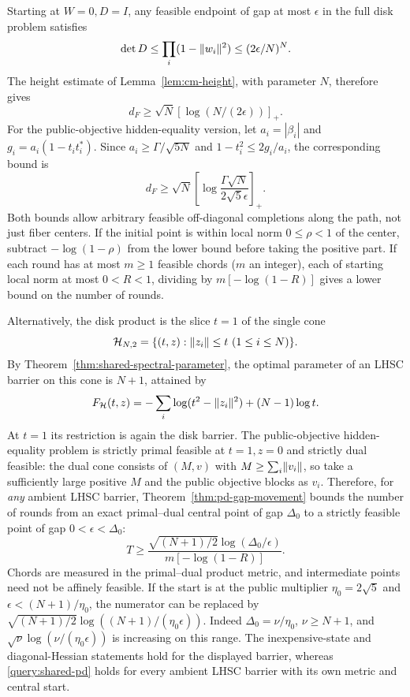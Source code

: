 Starting at $W=0,D=I$, any feasible endpoint of gap at most $\epsilon$
in the full disk problem satisfies
\[
 \det D\leq\prod_i(1-\lVert w_i\rVert^2)
       \leq(2\epsilon/N)^N.
\]
The height estimate of Lemma~\ref{lem:cm-height}, with parameter $N$,
therefore gives
\[
 d_F\geq\sqrt N[\log(N/(2\epsilon))]_+.
\]
For the public-objective hidden-equality version, let $a_i=|\beta_i|$
and $g_i=a_i(1-t_i t_i^*)$. Since $a_i\geq\Gamma/\sqrt{5N}$ and
$1-t_i^2\leq2g_i/a_i$, the corresponding bound is
\begin{equation}\label{query:packed-distance}
 d_F\geq\sqrt N
 \left[\log\frac{\Gamma\sqrt N}{2\sqrt5\epsilon}\right]_+.
\end{equation}
Both bounds allow arbitrary feasible off-diagonal completions along the
path, not just fiber centers. If the initial point is within local
norm $0\leq\rho<1$ of the center, subtract $-\log(1-\rho)$ from the
lower bound before taking the positive part. If each round has at most $m\geq1$ feasible chords ($m$ an integer), each of
starting local norm at most $0<R<1$, dividing by $m[-\log(1-R)]$ gives a
lower bound on the number of rounds.

Alternatively, the disk product is the slice $t=1$ of the single cone
\[
 \mathcal H_{N,2}=\{(t,z):\lVert z_i\rVert\leq t\ (1\leq i\leq N)\}.
\]
By Theorem~\ref{thm:shared-spectral-parameter}, the optimal parameter of
an LHSC barrier on this cone is $N+1$,
attained by
\[
 F_{\mathcal H}(t,z)=-\sum_i\log(t^2-\lVert z_i\rVert^2)+(N-1)\log t.
\]
At $t=1$ its restriction is again the disk barrier. The
public-objective hidden-equality problem is strictly primal feasible at
$t=1,z=0$ and strictly dual feasible: the dual cone consists of
$(M,v)$ with $M\geq\sum_i\lVert v_i\rVert$, so take a sufficiently large positive
$M$ and the public objective blocks as $v_i$.
Therefore, for \emph{any} ambient LHSC barrier,
Theorem~\ref{thm:pd-gap-movement} bounds the number of rounds from an
exact primal--dual central point
of gap $\Delta_0$ to a strictly feasible point of gap
$0<\epsilon<\Delta_0$:
\begin{equation}\label{query:shared-pd}
 T\geq\frac{\sqrt{(N+1)/2}\log(\Delta_0/\epsilon)}
                 {m[-\log(1-R)]}.
\end{equation}
Chords are measured in the primal--dual product metric, and
intermediate points need not be affinely feasible. If the start is at the public multiplier
$\eta_0=2\sqrt5$ and $\epsilon<(N+1)/\eta_0$, the numerator can be
replaced by
$\sqrt{(N+1)/2}\log((N+1)/(\eta_0\epsilon))$.
Indeed $\Delta_0=\nu/\eta_0$, $\nu\geq N+1$, and
$\sqrt\nu\log(\nu/(\eta_0\epsilon))$ is increasing on this range.
The inexpensive-state and diagonal-Hessian statements hold for the
displayed barrier, whereas \eqref{query:shared-pd} holds for every ambient LHSC barrier
with its own metric and central start.

